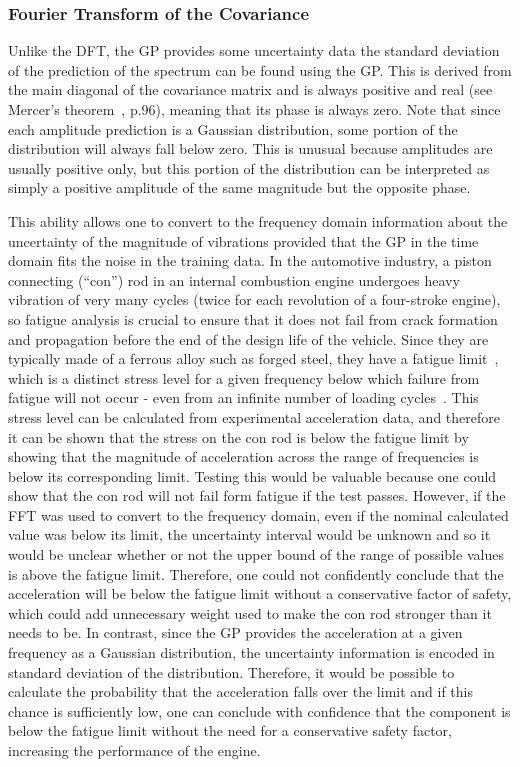 \documentclass[12pt]{article}
\begin{document}
    \subsubsection{Fourier Transform of the Covariance}
    Unlike the DFT, the GP provides some uncertainty data the standard deviation of the prediction of the spectrum can be found using the GP\@.
    This is derived from the main diagonal of the covariance matrix and is always positive and real (see Mercer's theorem~\cite{rasmussen2006gaussian}, p.96), meaning that its phase is always zero.
    Note that since each amplitude prediction is a Gaussian distribution, some portion of the distribution will always fall below zero.
    This is unusual because amplitudes are usually positive only, but this portion of the distribution can be interpreted as simply a positive amplitude of the same magnitude but the opposite phase.

    This ability allows one to convert to the frequency domain information about the uncertainty of the magnitude of vibrations provided that the GP in the time domain fits the noise in the training data.
    In the automotive industry, a piston connecting (``con'') rod in an internal combustion engine undergoes heavy vibration of very many cycles (twice for each revolution of a four-stroke engine), so fatigue analysis is crucial to ensure that it does not fail from crack formation and propagation before the end of the design life of the vehicle.
    Since they are typically made of a ferrous alloy such as forged steel, they have a fatigue limit~\cite{RoymechFatigue}, which is a distinct stress level for a given frequency below which failure from fatigue will not occur - even from an infinite number of loading cycles~\cite{BeerJohnston1992}.
    This stress level can be calculated from experimental acceleration data, and therefore it can be shown that the stress on the con rod is below the fatigue limit by showing that the magnitude of acceleration across the range of frequencies is below its corresponding limit.
    Testing this would be valuable because one could show that the con rod will not fail form fatigue if the test passes.
    However, if the FFT was used to convert to the frequency domain, even if the nominal calculated value was below its limit, the uncertainty interval would be unknown and so it would be unclear whether or not the upper bound of the range of possible values is above the fatigue limit.
    Therefore, one could not confidently conclude that the acceleration will be below the fatigue limit without a conservative factor of safety, which could add unnecessary weight used to make the con rod stronger than it needs to be.
    In contrast, since the GP provides the acceleration at a given frequency as a Gaussian distribution, the uncertainty information is encoded in standard deviation of the distribution.
    Therefore, it would be possible to calculate the probability that the acceleration falls over the limit and if this chance is sufficiently low, one can conclude with confidence that the component is below the fatigue limit without the need for a conservative safety factor, increasing the performance of the engine.
\end{document}
